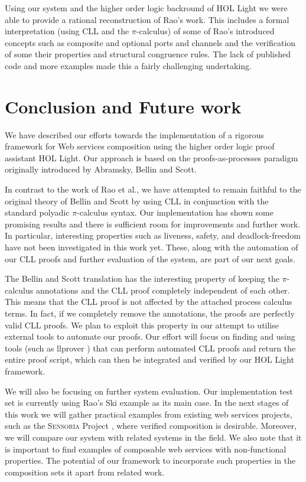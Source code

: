 \documentclass[copyright,creativecommons]{eptcs}
\begin{document}
Using our system and the higher order logic backround of HOL Light we were able to provide a rational reconstruction of Rao's work. This includes a formal interpretation (using CLL and the $\pi$-calculus) of some of Rao's introduced concepts such as composite and optional ports and channels and the verification of some their properties and structural congruence rules. The lack of published code and more examples made this a fairly challenging undertaking.

\section{Conclusion and Future work}
\label{conclusion}

We have described our efforts towards the implementation of a rigorous framework for Web services composition using the higher order logic proof assistant HOL Light. Our approach is based on the proofs-as-processes paradigm originally introduced by Abramsky, Bellin and Scott.

In contrast to the work of Rao et al., we have attempted to remain faithful to the original theory of Bellin and Scott by using CLL in conjunction with the standard polyadic $\pi$-calculus syntax. Our implementation has shown some promising results and there is sufficient room for improvements and further work. In particular, interesting properties such as liveness, safety, and deadlock-freedom have not been investigated in this work yet. These, along with the automation of our CLL proofs and further evaluation of the system, are part of our next goals.

The Bellin and Scott translation has the interesting property of keeping the $\pi$-calculus annotations and the CLL proof completely independent of each other. This means that the CLL proof is not affected by the attached process calculus terms. In fact, if we completely remove the annotations, the proofs are perfectly valid CLL proofs. We plan to exploit this property in our attempt to utilise external tools to automate our proofs. Our effort will focus on finding and using tools (such as llprover \cite{tamura1998user}) that can perform automated CLL proofs and return the entire proof script, which can then be integrated and verified by our HOL Light framework.

We will also be focusing on further system evaluation. Our implementation test set is currently using Rao's Ski example as its main case. In the next stages of this work we will gather practical examples from existing web services projects, such as the \textsc{Sensoria} Project \cite{sensoria2006}, where verified composition is desirable. Moreover, we will compare our system with related systems in the field. We also note that it is important to find examples of composable web services with non-functional properties. The potential of our framework to incorporate such properties in the composition sets it apart from related work. 
\end{document}
